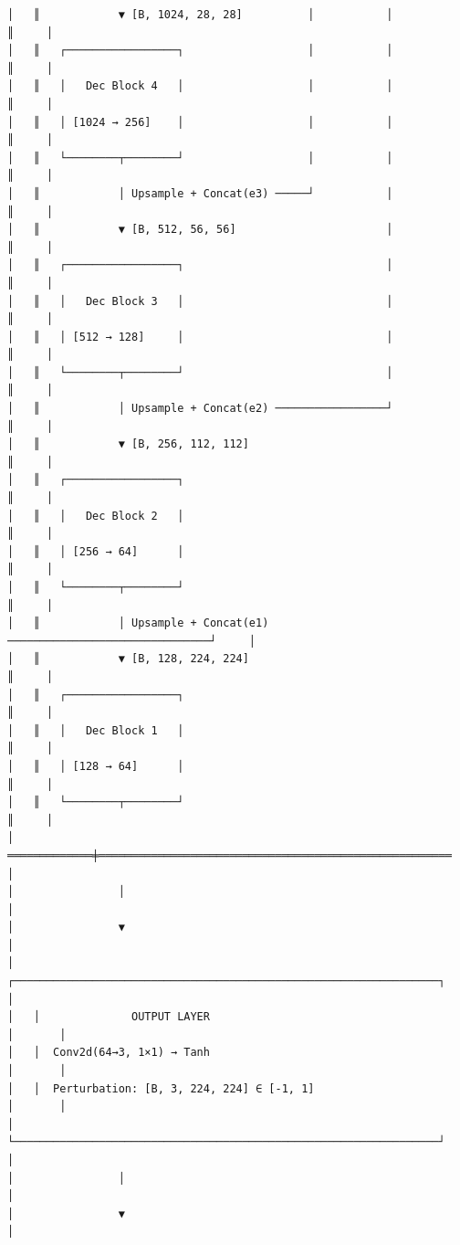 \begin{verbatim}
│   ║            ▼ [B, 1024, 28, 28]          │           │             ║     │
│   ║   ┌─────────────────┐                   │           │             ║     │
│   ║   │   Dec Block 4   │                   │           │             ║     │
│   ║   │ [1024 → 256]    │                   │           │             ║     │
│   ║   └────────┬────────┘                   │           │             ║     │
│   ║            │ Upsample + Concat(e3) ─────┘           │             ║     │
│   ║            ▼ [B, 512, 56, 56]                       │             ║     │
│   ║   ┌─────────────────┐                               │             ║     │
│   ║   │   Dec Block 3   │                               │             ║     │
│   ║   │ [512 → 128]     │                               │             ║     │
│   ║   └────────┬────────┘                               │             ║     │
│   ║            │ Upsample + Concat(e2) ─────────────────┘             ║     │
│   ║            ▼ [B, 256, 112, 112]                                   ║     │
│   ║   ┌─────────────────┐                                             ║     │
│   ║   │   Dec Block 2   │                                             ║     │
│   ║   │ [256 → 64]      │                                             ║     │
│   ║   └────────┬────────┘                                             ║     │
│   ║            │ Upsample + Concat(e1) ───────────────────────────────┘     │
│   ║            ▼ [B, 128, 224, 224]                                   ║     │
│   ║   ┌─────────────────┐                                             ║     │
│   ║   │   Dec Block 1   │                                             ║     │
│   ║   │ [128 → 64]      │                                             ║     │
│   ║   └────────┬────────┘                                             ║     │
│   ═════════════╪══════════════════════════════════════════════════════      │
│                │                                                            │
│                ▼                                                            │
│   ┌─────────────────────────────────────────────────────────────────┐       │
│   │              OUTPUT LAYER                                       │       │
│   │  Conv2d(64→3, 1×1) → Tanh                                       │       │
│   │  Perturbation: [B, 3, 224, 224] ∈ [-1, 1]                       │       │
│   └─────────────────────────────────────────────────────────────────┘       │
│                │                                                            │
│                ▼                                                            │

\end{verbatim}
